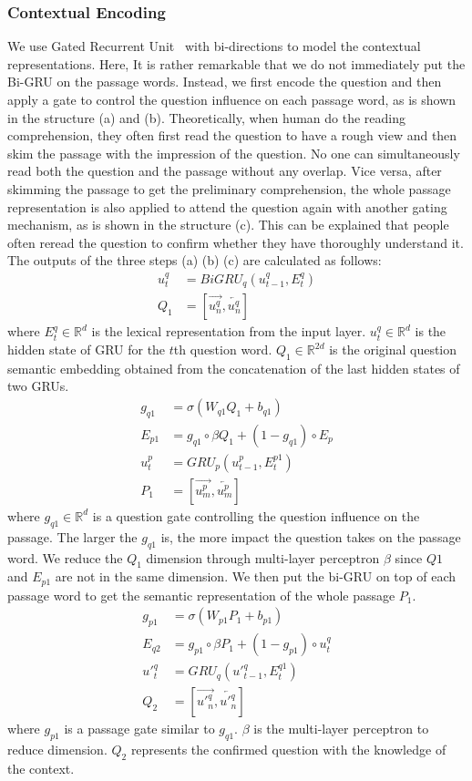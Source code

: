 \documentclass[letterpaper]{article} \usepackage{aaai18}  \usepackage{times}  \usepackage{helvet}  \usepackage{courier}  \usepackage{url}  \usepackage{graphicx}  \usepackage{booktabs}
\begin{document}
 \subsubsection{Contextual Encoding} We use Gated Recurrent Unit~\cite{Cho2014Learning} with bi-directions to model the contextual representations. Here, It is rather remarkable that we do not immediately put the Bi-GRU on the passage words. Instead, we first encode the question and then apply a gate to control the question influence on each passage word, as is shown in the structure (a) and (b). Theoretically, when human do the reading comprehension, they often first read the question to have a rough view and then skim the passage with the impression of the question. No one can simultaneously read both the question and the passage without any overlap. Vice versa, after skimming the passage to get the preliminary comprehension, the whole passage representation is also applied to attend the question again with another gating mechanism, as is shown in the structure (c). This can be explained that people often reread the question to confirm whether they have thoroughly understand it. The outputs of the three steps (a) (b) (c) are calculated as follows:
 \begin{align*}
u^q_t &= BiGRU_q(u^q_{t-1}, E_t^q) \\
Q_1&= \left [ \overrightarrow{u_n^q},\overleftarrow{u_n^q} \right ] \tag{4}
 \end{align*} 
 where $E_t^q \in \mathbb{R}^d $ is the lexical representation from the input layer. $u_t^q  \in \mathbb{R}^d$ is the hidden state of GRU for the $t$th question word. $Q_1 \in \mathbb{R}^{2d}$ is the original question semantic embedding obtained from the concatenation of the last hidden states of two GRUs.  
 \begin{align*}
g_{q1}&=\sigma(W_{q1}Q_1+b_{q1})\\
E_{p1}&=g_{q1}\circ \beta Q_1+(1-g_{q1})\circ E_p\\
u_t^p&=GRU_p(u_{t-1}^p,E_t^{p1})\\
P_1&= \left [ \overrightarrow{u_m^p},\overleftarrow{u_m^p} \right ] \tag{5}
\end{align*}
where $g_{q1} \in \mathbb{R}^d$ is a question gate controlling the question influence on the passage. The larger the $g_{q1}$ is, the more impact the question takes on the passage word. We reduce the $Q_1$ dimension through multi-layer perceptron $\beta$ since $Q1$ and $E_{p1}$ are not in the same dimension. We then put the bi-GRU on top of each passage word to get the semantic representation of the whole passage $P_1$.    
\begin{align*}
g_{p1}&=\sigma(W_{p1}P_1+b_{p1})\\
E_{q2}&=g_{p1}\circ \beta P_1+(1-g_{p1}) \circ u_t^q \\
{u}'^q_t &= GRU_q({u}'^q_{t-1}, E_t^{q1}) \\
Q_2&= [ \overrightarrow{{u'}_n^q},\overleftarrow{{u'}_n^q}] \tag{6}
\end{align*}
 where $g_{p1}$ is a passage gate similar to $g_{q1}$. $\beta$ is the multi-layer perceptron to reduce dimension. $Q_2$ represents the confirmed question with the knowledge of the context.
 
\end{document}
